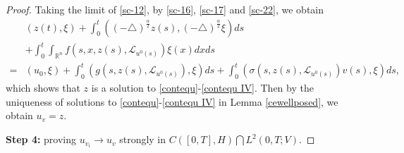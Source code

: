 \documentclass[11pt]{article}
\numberwithin{equation}{section}
\theoremstyle{plain}
\begin{document}
\begin{proof}
    Taking the limit  of \eqref{sc-12}, by \eqref{sc-16}, \eqref{sc-17} and \eqref{sc-22},
    we  obtain
    \begin{align*}
        & \left( z (t), \xi \right)
        + \int_0^t
        \left( (-\triangle)^{\frac{\alpha}{2}} z(s),
        (-\triangle)^{\frac{\alpha}{2}} \xi
        \right) ds
        \nonumber \\
        & + \int_0^t \int_{\mathbb{R}^n} f( s, x, z(s), \mathcal{L}_{u^0(s)} ) \xi(x) dx ds
        \nonumber\\
        = & \left(u_0, \xi\right)
        + \int_0^t \left( g(s, z(s), \mathcal{L}_{u^0(s)} ), \xi \right) ds
        + \int_0^t \left( \sigma(s, z(s), \mathcal{L}_{u^0(s)} ) v(s), \xi \right) ds,
    \end{align*}
    which shows that  $z$ is a solution to \eqref{contequ}-\eqref{contequ IV}.
    Then by the uniqueness of solutions to \eqref{contequ}-\eqref{contequ IV} in Lemma \ref{cewellposed},
    we obtain $u_v = z$.

    {\bf Step 4:}   proving
    $ u_{v_i}  \rightarrow  u_v $ strongly in  $C([0,T], H) \bigcap L^2(0,T; V)$.


\end{proof}
\end{document}
